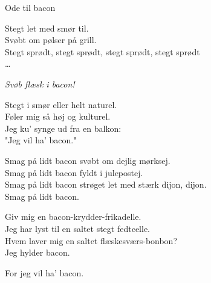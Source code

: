 \begin{song}{Ode til bacon}
  \begin{SBVerse}
    Stegt let med smør til.\\
    Svøbt om pølser på grill.\\
    Stegt sprødt, stegt sprødt, stegt sprødt, stegt sprødt\\
    \ldots
  \end{SBVerse}

  \begin{SBSection*}
    \emph{Svøb flæsk i bacon!}
  \end{SBSection*}

  \begin{SBSection*}
    Stegt i smør eller helt naturel.\\
    Føler mig så høj og kulturel.\\
    Jeg ku’ synge ud fra en balkon:\\
    "Jeg vil ha’ bacon."
  \end{SBSection*}

  \begin{SBChorus}
    Smag på lidt bacon svøbt om dejlig mørksej.\\
    Smag på lidt bacon fyldt i julepostej.\\
    Smag på lidt bacon strøget let med stærk dijon, dijon.\\
    Smag på lidt bacon.
  \end{SBChorus}

  \begin{SBChorus}
    Giv mig en bacon-krydder-frikadelle.\\
    Jeg har lyst til en saltet stegt fedtcelle.\\
    Hvem laver mig en saltet flæskesværs-bonbon?\\
    Jeg hylder bacon.
  \end{SBChorus}

  \begin{SBSection*}
    For jeg vil ha’ bacon.
  \end{SBSection*}
\end{song}